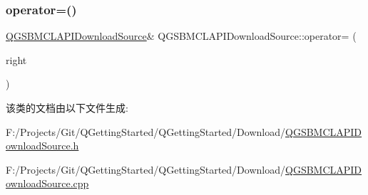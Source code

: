 \mbox{\label{class_q_g_s_b_m_c_l_a_p_i_download_source_ad616d04eb51faf150f578d227890cc74}} 
\subsubsection{\texorpdfstring{operator=()}{operator=()}\hspace{0.1cm}{\footnotesize\ttfamily [2/2]}}
{\footnotesize\ttfamily \mbox{\hyperlink{class_q_g_s_b_m_c_l_a_p_i_download_source}{Q\+G\+S\+B\+M\+C\+L\+A\+P\+I\+Download\+Source}}\& Q\+G\+S\+B\+M\+C\+L\+A\+P\+I\+Download\+Source\+::operator= (\begin{DoxyParamCaption}\item[{\mbox{\hyperlink{class_q_g_s_b_m_c_l_a_p_i_download_source}{Q\+G\+S\+B\+M\+C\+L\+A\+P\+I\+Download\+Source}} \&\&}]{right }\end{DoxyParamCaption})\hspace{0.3cm}{\ttfamily [delete]}}



该类的文档由以下文件生成\+:\begin{DoxyCompactItemize}
\item 
F\+:/\+Projects/\+Git/\+Q\+Getting\+Started/\+Q\+Getting\+Started/\+Download/\mbox{\hyperlink{_q_g_s_b_m_c_l_a_p_i_download_source_8h}{Q\+G\+S\+B\+M\+C\+L\+A\+P\+I\+Download\+Source.\+h}}\item 
F\+:/\+Projects/\+Git/\+Q\+Getting\+Started/\+Q\+Getting\+Started/\+Download/\mbox{\hyperlink{_q_g_s_b_m_c_l_a_p_i_download_source_8cpp}{Q\+G\+S\+B\+M\+C\+L\+A\+P\+I\+Download\+Source.\+cpp}}\end{DoxyCompactItemize}
